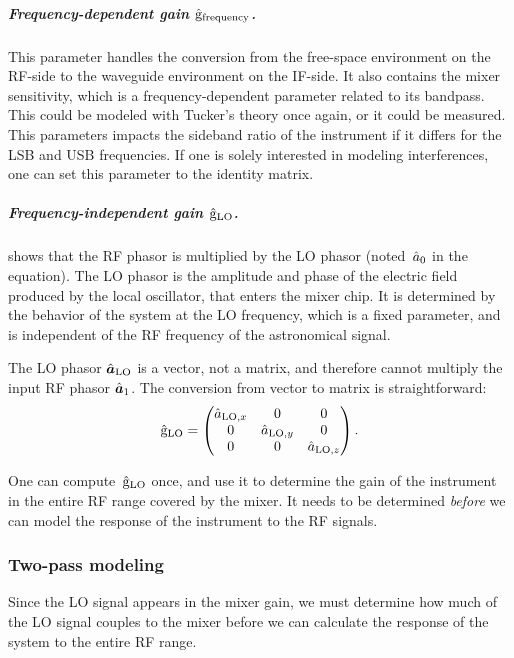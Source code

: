 \subparagraph{Frequency-dependent gain $\hat{\mathrm{g}}_\text{frequency}$.}
This parameter handles the conversion from the free-space environment on the RF-side
to the waveguide environment on the IF-side.
It also contains the mixer sensitivity, which is a frequency-dependent parameter related to its bandpass.
This could be modeled with Tucker's theory once again, or it could be measured.
This parameters impacts the sideband ratio of the instrument if it differs for the LSB and USB frequencies.
If one is solely interested in modeling interferences, one can set this parameter to the identity matrix.

\subparagraph{Frequency-independent gain $\hat{\mathrm{g}}_\text{LO}$.}
 shows that the RF phasor is multiplied by the LO phasor (noted~$\hat{a}_0$ in the equation).
The LO phasor is the amplitude and phase of the electric field produced by the local oscillator, that enters the mixer chip.
It is determined by the behavior of the system at the LO frequency, which is a fixed parameter, and is independent of the RF frequency of the astronomical signal.

The LO phasor $\hat{\bm{a}}_\text{LO}$ is a vector, not a matrix, and therefore cannot multiply the input RF phasor $\hat{\bm{a}}_1$.
The conversion from vector to matrix is straightforward:
\begin{equation}
    \hat{\mathrm{g}}_\text{LO}
    =
    \begin{pmatrix}
                \hat{a}_{\text{LO}, x} & 0 & 0 \\
            0 & \hat{a}_{\text{LO}, y} & 0 \\
        0 & 0 & \hat{a}_{\text{LO}, z}
    \end{pmatrix}
    \text{.}
    \label{eq:LO_phasor_to_gain}
\end{equation}

One can compute~$\hat{\mathrm{g}}_\text{LO}$ once, and use it to determine the gain of the instrument in the entire RF range covered by the mixer.
It needs to be determined \emph{before} we can model the response of the instrument to the RF signals.

\subsubsection{Two-pass modeling}
Since the LO signal appears in the mixer gain,
we must determine how much of the LO signal couples to the mixer before we can calculate the response of the system to the entire RF range.

